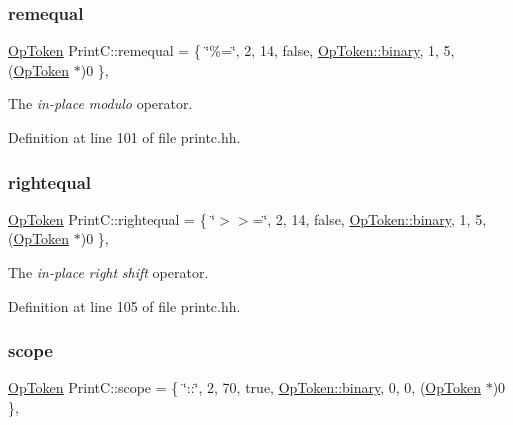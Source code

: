 \mbox{\label{class_print_c_a0b244f1e62f37ce148448b07190beae6}} 
\subsubsection{\texorpdfstring{remequal}{remequal}}
{\footnotesize\ttfamily \mbox{\hyperlink{class_op_token}{Op\+Token}} Print\+C\+::remequal = \{ \char`\"{}\%=\char`\"{}, 2, 14, false, \mbox{\hyperlink{class_op_token_af41c7f108d5662ede7765c5a6c44eaffa3a2ec63522a9329a71ddbe8adc3e752d}{Op\+Token\+::binary}}, 1, 5, (\mbox{\hyperlink{class_op_token}{Op\+Token}} $\ast$)0 \}\hspace{0.3cm}{\ttfamily [static]}, {\ttfamily [protected]}}



The {\itshape in-\/place} {\itshape modulo} operator. 



Definition at line 101 of file printc.\+hh.

\mbox{\label{class_print_c_a6f50c852d70d9da7e4fc76cf695b45c1}} 
\subsubsection{\texorpdfstring{rightequal}{rightequal}}
{\footnotesize\ttfamily \mbox{\hyperlink{class_op_token}{Op\+Token}} Print\+C\+::rightequal = \{ \char`\"{}$>$$>$=\char`\"{}, 2, 14, false, \mbox{\hyperlink{class_op_token_af41c7f108d5662ede7765c5a6c44eaffa3a2ec63522a9329a71ddbe8adc3e752d}{Op\+Token\+::binary}}, 1, 5, (\mbox{\hyperlink{class_op_token}{Op\+Token}} $\ast$)0 \}\hspace{0.3cm}{\ttfamily [static]}, {\ttfamily [protected]}}



The {\itshape in-\/place} {\itshape right} {\itshape shift} operator. 



Definition at line 105 of file printc.\+hh.

\mbox{\label{class_print_c_ad83977328e9bfa4f33276563a4306d3e}} 
\subsubsection{\texorpdfstring{scope}{scope}}
{\footnotesize\ttfamily \mbox{\hyperlink{class_op_token}{Op\+Token}} Print\+C\+::scope = \{ \char`\"{}\+::\char`\"{}, 2, 70, true, \mbox{\hyperlink{class_op_token_af41c7f108d5662ede7765c5a6c44eaffa3a2ec63522a9329a71ddbe8adc3e752d}{Op\+Token\+::binary}}, 0, 0, (\mbox{\hyperlink{class_op_token}{Op\+Token}} $\ast$)0 \}\hspace{0.3cm}{\ttfamily [static]}, {\ttfamily [protected]}}



